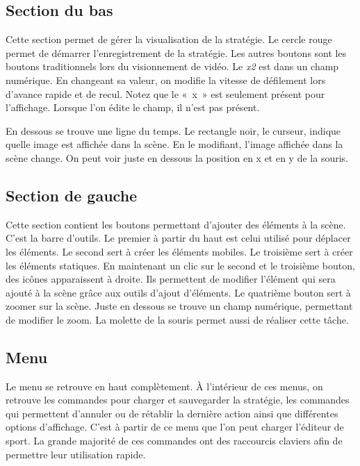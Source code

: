 \subsection{Section du bas}

Cette section permet de gérer la visualisation de la stratégie. Le cercle rouge permet de démarrer l'enregistrement de la stratégie. Les autres boutons sont les boutons traditionnels lors du visionnement de vidéo. Le \textit{x2} est dans un champ numérique. En changeant sa valeur, on modifie la vitesse de défilement lors d'avance rapide et de recul. Notez que le «~x~» est seulement présent pour l'affichage. Lorsque l'on édite le champ, il n'est pas présent.

En dessous se trouve une ligne du temps. Le rectangle noir, le curseur, indique quelle image est affichée dans la scène. En le modifiant, l'image affichée dans la scène change. On peut voir juste en dessous la position en x et en y de la souris.

\subsection{Section de gauche}

Cette section contient les boutons permettant d'ajouter des éléments à la scène. C'est la barre d'outils. Le premier à partir du haut est celui utilisé pour déplacer les éléments. Le second sert à créer les éléments mobiles. Le troisième sert à créer les éléments statiques. En maintenant un clic sur le second et le troisième bouton, des icônes apparaissent à droite. Ils permettent de modifier l'élément qui sera ajouté à la scène grâce aux outils d'ajout d'éléments. Le quatrième bouton sert à zoomer sur la scène. Juste en dessous se trouve un champ numérique, permettant de modifier le zoom. La molette de la souris permet aussi de réaliser cette tâche.

\subsection{Menu}

Le menu se retrouve en haut complètement. À l'intérieur de ces menus, on retrouve les commandes pour charger et sauvegarder la stratégie, les commandes qui permettent d'annuler ou de rétablir la dernière action ainsi que différentes options d'affichage. C'est à partir de ce menu que l'on peut charger l'éditeur de sport. La grande majorité de ces commandes ont des raccourcis claviers afin de permettre leur utilisation rapide.